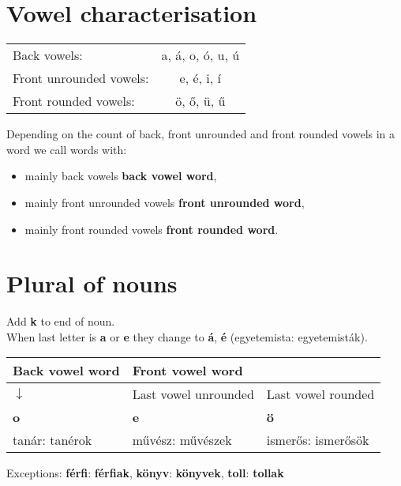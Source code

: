 \documentclass{article}
\begin{document}
\section{Vowel characterisation}
\begin{tabularx}{\textwidth} { X c } \toprule
	Back vowels: & a, á, o, ó, u, ú  \\
	Front unrounded vowels: & e, é, i, í­ \\
	Front rounded vowels: & ö, ő, ü, ű \\ \bottomrule
\end{tabularx}
Depending on the count of back, front unrounded and front rounded vowels in a word we call words with:
\begin{itemize}
\item mainly back vowels \textbf{back vowel word},
\item mainly front unrounded vowels \textbf{front unrounded word},
\item mainly front rounded vowels \textbf{front rounded word}.
\end{itemize}
		


\section{Plural of nouns}
Add \textbf{k} to end of noun.  \\
When last letter is \textbf{a} or \textbf{e} they change to \textbf{á}, \textbf{é} (egyetemista: egyetemisták). \\
\begin{tabularx} {\textwidth}{ X X l } \toprule
	Back vowel word & Front vowel word & \\ \midrule
	 $\downarrow$ & Last vowel unrounded & Last vowel rounded \\
	\textbf{o} & \textbf{e} & \textbf{ö} \\ \midrule
	tanár: tanérok & művész: művészek & ismerős: ismerősök \\ \bottomrule
\end{tabularx}
Exceptions: \textbf{férfi}: \textbf{férfiak}, \textbf{könyv}: \textbf{könyvek}, \textbf{toll}: \textbf{tollak}
\end{document}
